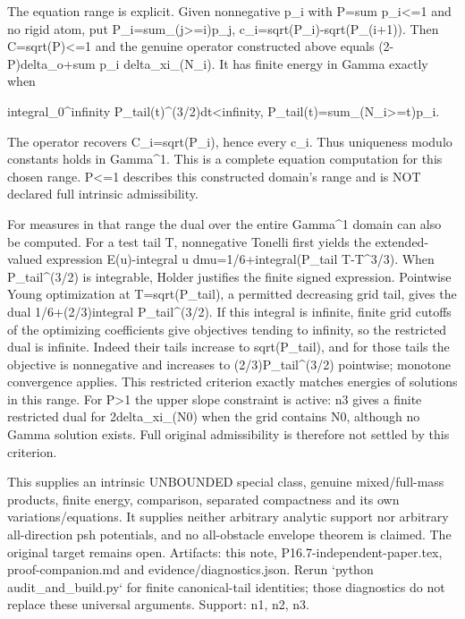 \documentclass[11pt]{article}
\begin{document}
The equation range is explicit. Given nonnegative p\_i with P=sum p\_i<=1 and no rigid atom, put P\_i=sum\_(j>=i)p\_j, c\_i=sqrt(P\_i)-sqrt(P\_(i+1)). Then C=sqrt(P)<=1 and the genuine operator constructed above equals (2-P)delta\_o+sum p\_i delta\_xi\_(N\_i). It has finite energy in Gamma exactly when

integral\_0\textasciicircum{}infinity P\_tail(t)\textasciicircum{}(3/2)dt<infinity,
P\_tail(t)=sum\_(N\_i>=t)p\_i.

The operator recovers C\_i=sqrt(P\_i), hence every c\_i. Thus uniqueness modulo constants holds in Gamma\textasciicircum{}1. This is a complete equation computation for this chosen range. P<=1 describes this constructed domain's range and is NOT declared full intrinsic admissibility.

For measures in that range the dual over the entire Gamma\textasciicircum{}1 domain can also be computed. For a test tail T, nonnegative Tonelli first yields the extended-valued expression E(u)-integral u dmu=1/6+integral(P\_tail T-T\textasciicircum{}3/3). When P\_tail\textasciicircum{}(3/2) is integrable, Holder justifies the finite signed expression. Pointwise Young optimization at T=sqrt(P\_tail), a permitted decreasing grid tail, gives the dual 1/6+(2/3)integral P\_tail\textasciicircum{}(3/2). If this integral is infinite, finite grid cutoffs of the optimizing coefficients give objectives tending to infinity, so the restricted dual is infinite. Indeed their tails increase to sqrt(P\_tail), and for those tails the objective is nonnegative and increases to (2/3)P\_tail\textasciicircum{}(3/2) pointwise; monotone convergence applies. This restricted criterion exactly matches energies of solutions in this range. For P>1 the upper slope constraint is active: n3 gives a finite restricted dual for 2delta\_xi\_(N0) when the grid contains N0, although no Gamma solution exists. Full original admissibility is therefore not settled by this criterion.

This supplies an intrinsic UNBOUNDED special class, genuine mixed/full-mass products, finite energy, comparison, separated compactness and its own variations/equations. It supplies neither arbitrary analytic support nor arbitrary all-direction psh potentials, and no all-obstacle envelope theorem is claimed. The original target remains open. Artifacts: this note, P16.7-independent-paper.tex, proof-companion.md and evidence/diagnostics.json. Rerun `python audit\_and\_build.py` for finite canonical-tail identities; those diagnostics do not replace these universal arguments. Support: n1, n2, n3.
\end{document}
